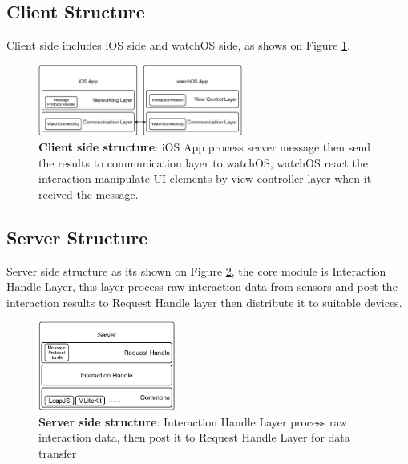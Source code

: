 \subsection{Client Structure}

Client side includes iOS side and watchOS side, as shows on Figure \ref{fig:client-arch}.

\begin{figure}[H]
    \kaishu
    \centering
    \includegraphics[width=0.6\textwidth]{figures/client-arch}
    \caption{\kaishu \textbf{Client side structure}: iOS App process server message then send the results to communication layer to watchOS, watchOS react the interaction manipulate UI elements by view controller layer when it recived the message.}
    \label{fig:client-arch}
\end{figure}

\subsection{Server Structure}

Server side structure as its shown on Figure \ref{fig:server-arch}, the core module is Interaction Handle Layer, this layer process raw interaction data from sensors and post the interaction results to Request Handle layer then distribute it to suitable devices.

\begin{figure}[H]
    \kaishu
    \centering
    \includegraphics[width=0.4\textwidth]{figures/server-arch}
    \caption{\kaishu \textbf{Server side structure}: Interaction Handle Layer process raw interaction data, then post it to Request Handle Layer for data transfer}
    \label{fig:server-arch}
\end{figure}


